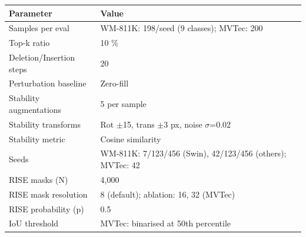 \documentclass[11pt,a4paper]{article}
\begin{document}
\begin{tabular}{ll}
\toprule
Parameter & Value \\
\midrule
Samples per eval & WM-811K: 198/seed (9 classes); MVTec: 200 \\
Top-k ratio & 10 \% \\
Deletion/Insertion steps & 20 \\
Perturbation baseline & Zero-fill \\
Stability augmentations & 5 per sample \\
Stability transforms & Rot $\pm$15\textdegree{}, trans $\pm$3 px, noise $\sigma$=0.02 \\
Stability metric & Cosine similarity \\
Seeds & WM-811K: 7/123/456 (Swin), 42/123/456 (others); MVTec: 42 \\
RISE masks (N) & 4,000 \\
RISE mask resolution & 8 (default); ablation: 16, 32 (MVTec) \\
RISE probability (p) & 0.5 \\
IoU threshold & MVTec: binarised at 50th percentile \\
\bottomrule
\end{tabular}



\begin{table}[htbp]
\centering
\small
\caption{\textbf{Supplementary Table S3.} Per-seed classification results for all nine WM-811K paper runs}
\end{table}
\end{document}
